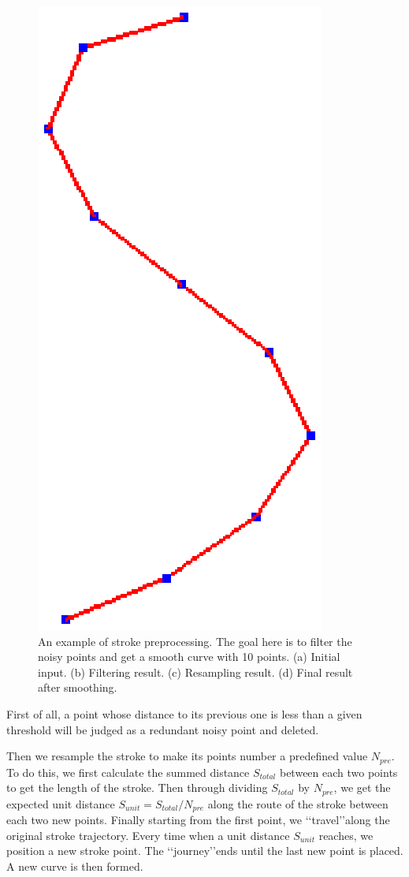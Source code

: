 \begin{figure} [htbp]
{\begin{minipage}[b]{0.2\textwidth}
      \includegraphics[scale=0.3]{figs/f3.strokepre-4.eps}
    \end{minipage}}
  \caption{An example of stroke preprocessing. The goal here is to filter the noisy points and get a smooth curve with 10 points. 
  (a) Initial input. 
  (b) Filtering result. 
  (c) Resampling result. 
  (d) Final result after smoothing.}
  \label{fig:alstrokeproc} %
\end{figure}

First of all, a point whose distance to its previous one is less
than a given threshold will be judged as a redundant noisy point and
deleted.

Then we resample the stroke to make its points number a  predefined
value $N_{pre}$. To do this, we first calculate the summed distance
$S_{total}$ between each two points to get the length of the stroke.
Then through dividing $S_{total}$ by $N_{pre}$, we get the expected
unit distance $S_{unit}=S_{total} / N_{pre}$ along the route of the
stroke between each two new points. Finally starting from the first
point, we \lq\lq{travel}\rq\rq along the original stroke trajectory.
Every time when a unit distance $S_{unit}$ reaches, we position a
new stroke point. The \lq\lq{journey}\rq\rq ends until the last new
point is placed. A new curve is then formed.

